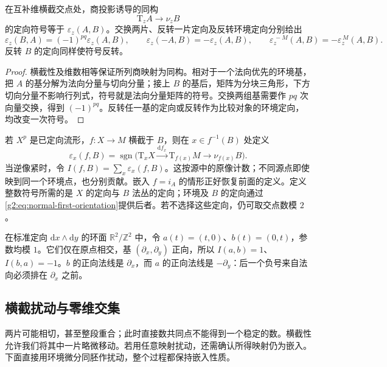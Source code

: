 \begin{proposition}\label{g2:prop:intersection-linear-signs}
	在互补维横截交点处，商投影诱导的同构
	\[
		\mathrm{T}_zA\longrightarrow\nu_zB
	\]
	的定向符号等于 \(\varepsilon_z(A,B)\)。交换两片、反转一片定向及反转环境定向分别给出
	\[
		\varepsilon_z(B,A)=(-1)^{pq}\varepsilon_z(A,B),\qquad
		\varepsilon_z(-A,B)=-\varepsilon_z(A,B),\qquad
		\varepsilon_z^{\,-M}(A,B)=-\varepsilon_z^{\,M}(A,B).
	\]
	反转 \(B\) 的定向同样使符号反转。
\end{proposition}
\begin{proof}
	横截性及维数相等保证所列商映射为同构。相对于一个法向优先的环境基，把 \(A\) 的基分解为法向分量与切向分量；接上 \(B\) 的基后，矩阵为分块三角形，下方切向分量不影响行列式，符号就是法向分量矩阵的符号。交换两组基需要作 \(pq\) 次向量交换，得到 \((-1)^{pq}\)。反转任一基的定向或反转作为比较对象的环境定向，均改变一次符号。
\end{proof}

若 \(X^p\) 是已定向流形，\(f:X\to M\) 横截于 \(B\)，则在 \(x\in f^{-1}(B)\) 处定义
\[
	\varepsilon_x(f,B)=\operatorname{sgn}\bigl(\mathrm{T}_xX\xrightarrow{\mathrm{d}f_x}\mathrm{T}_{f(x)}M\longrightarrow\nu_{f(x)}B\bigr).
\]
当逆像紧时，令 \(I(f,B)=\sum_x\varepsilon_x(f,B)\)。这按源中的原像计数；不同源点即使映到同一个环境点，也分别贡献。嵌入 \(f=i_A\) 的情形正好恢复前面的定义。定义整数符号所需的是 \(X\) 的定向与 \(B\) 法丛的定向；环境及 \(B\) 的定向通过\eqref{g2:eq:normal-first-orientation}提供后者。若不选择这些定向，仍可取交点数模 \(2\)。

\begin{example}\label{g2:exm:torus-basic-intersection}
	在标准定向 \(\mathrm{d}x\wedge\mathrm{d}y\) 的环面 \(\mathbb R^2/\mathbb Z^2\) 中，令 \(a(t)=(t,0)\)、\(b(t)=(0,t)\)，参数均模 \(1\)。它们仅在原点相交，基 \((\partial_x,\partial_y)\) 正向，所以 \(I(a,b)=1\)、\(I(b,a)=-1\)。\(b\) 的正向法线是 \(\partial_x\)，而 \(a\) 的正向法线是 \(-\partial_y\)：后一个负号来自法向必须排在 \(\partial_x\) 之前。
\end{example}

\subsection{横截扰动与零维交集}
\label{g2:subsec:1602:02}

两片可能相切，甚至整段重合；此时直接数共同点不能得到一个稳定的数。横截性允许我们将其中一片略微移动。若用任意映射扰动，还需确认所得映射仍为嵌入。下面直接用环境微分同胚作扰动，整个过程都保持嵌入性质。

